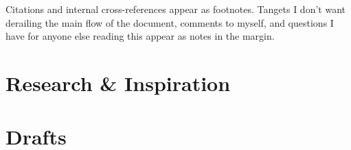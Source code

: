 \documentclass{article}
\newcounter{marginnote}[section]
\renewcommand\thepage{\roman{page}}
\begin{document}
  
  
  \edef\marginnotetextwidth{\the\textwidth}
  \noindent Citations and internal cross-references appear as footnotes. Tangets I don't want derailing the main flow of the document, comments to myself, and questions I have for anyone else reading this appear as notes in the margin.
  \newpage
  
  \part*{Research \& Inspiration}
  
  \newpage
  \renewcommand\thepage{\arabic{page}}
  \setcounter{page}{1}

  
  
  
  \part{Drafts}
  
\end{document}
